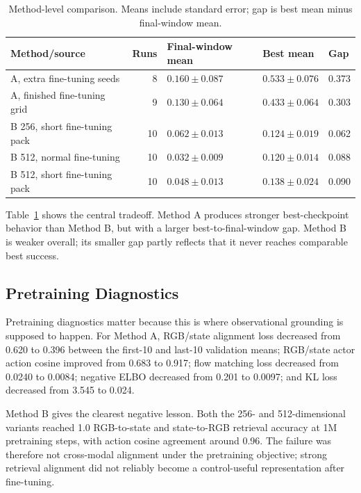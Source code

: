 \documentclass{article}
\begin{document}
\begin{table}[H]
    \centering
    \small
    \caption{Method-level comparison. Means include standard error; gap is best mean minus final-window mean.}
    \label{tab:stability}
    \begin{tabularx}{\linewidth}{Xrlll}
        \toprule
        Method/source & Runs & Final-window mean & Best mean & Gap \\
        \midrule
        A, extra fine-tuning seeds & 8 & $0.160 \pm 0.087$ & $0.533 \pm 0.076$ & 0.373 \\
        A, finished fine-tuning grid & 9 & $0.130 \pm 0.064$ & $0.433 \pm 0.064$ & 0.303 \\
        B 256, short fine-tuning pack & 10 & $0.062 \pm 0.013$ & $0.124 \pm 0.019$ & 0.062 \\
        B 512, normal fine-tuning & 10 & $0.032 \pm 0.009$ & $0.120 \pm 0.014$ & 0.088 \\
        B 512, short fine-tuning pack & 10 & $0.048 \pm 0.013$ & $0.138 \pm 0.024$ & 0.090 \\
        \bottomrule
    \end{tabularx}
\end{table}

Table~\ref{tab:stability} shows the central tradeoff. Method A produces stronger best-checkpoint behavior than Method B, but with a larger best-to-final-window gap. Method B is weaker overall; its smaller gap partly reflects that it never reaches comparable best success.

\subsection{Pretraining Diagnostics}

Pretraining diagnostics matter because this is where observational grounding is supposed to happen. For Method A, RGB/state alignment loss decreased from 0.620 to 0.396 between the first-10 and last-10 validation means; RGB/state actor action cosine improved from 0.683 to 0.917; flow matching loss decreased from 0.0240 to 0.0084; negative ELBO decreased from 0.201 to 0.0097; and KL loss decreased from 3.545 to 0.024.

Method B gives the clearest negative lesson. Both the 256- and 512-dimensional variants reached 1.0 RGB-to-state and state-to-RGB retrieval accuracy at 1M pretraining steps, with action cosine agreement around 0.96. The failure was therefore not cross-modal alignment under the pretraining objective; strong retrieval alignment did not reliably become a control-useful representation after fine-tuning.
\end{document}

